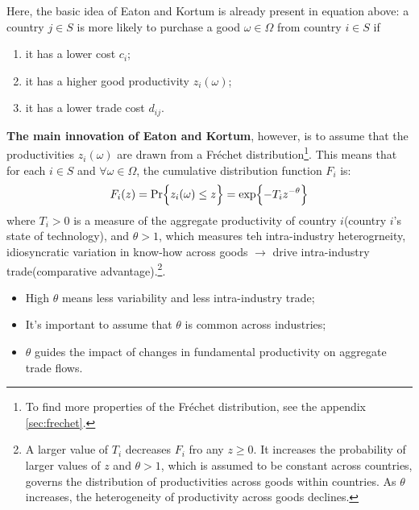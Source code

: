 Here, the basic idea of Eaton and Kortum is already present in equation above:
a country $j \in S$ is more likely to purchase a good $\omega \in \Omega$ from country $i \in S$ if
\begin{enumerate}
    \item[(1)] it has a lower cost $c_i$;
    \item[(2)] it has a higher good productivity $z_i(\omega)$;
    \item[(3)] it has a lower trade cost $d_{ij}$. 
\end{enumerate}

\textbf{The main innovation of Eaton and Kortum}, however, is to assume that the productivities $z_i(\omega)$ are drawn from a Fréchet distribution\footnote{To find more properties of the Fréchet distribution, see the appendix \ref{sec:frechet}.}.
This means that for each $i \in S$ and $\forall \omega \in \Omega$, the cumulative distribution function $F_i$ is:
\[
F_i(z) = \operatorname{Pr}\Bigl\{z_i(\omega) \leq z \Bigr\} = \exp \Bigl\{-T_i z^{-\theta} \Bigr\}
\]
where $T_i > 0$ is a measure of the aggregate productivity of country $i$(country $i$'s state of technology), and $\theta>1$, 
which measures teh intra-industry heterogrneity, idiosyncratic variation in know-how across goods $\rightarrow$ drive intra-industry trade(comparative advantage).\footnote{A larger value of $T_i$ decreases $F_i$ fro any $z\geq 0$. It increases the probability of larger values
of $z$ and $\theta>1$, which is assumed to be constant across countries, governs the distribution of productivities across goods within countries. As $\theta$ increases, the heterogeneity of productivity across goods declines.}.
\begin{itemize}
    \item High $\theta$ means less variability and less intra-industry trade;
    \item It's important to assume that $\theta$ is common across industries;
    \item $\theta$ guides the impact of changes in fundamental productivity on aggregate trade flows.
\end{itemize}


